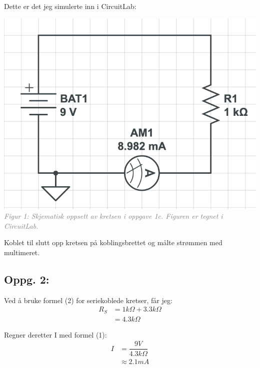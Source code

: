 \documentclass{article}
\begin{document}
             Dette er det jeg simulerte inn i CircuitLab: \linebreak
            \begin{center}
                \includegraphics[scale=0.5]{vedlegg/1c.png}\linebreak
                \textit{\textcolor{gray}{Figur 1: Skjematisk oppsett av kretsen i oppgave 1c. Figuren er tegnet i CircuitLab.}}
            \end{center} 
            
            Koblet til slutt opp kretsen på koblingsbrettet og målte strømmen med multimeret.
        
        \subsection*{Oppg. 2:}
            Ved å bruke formel (2) for seriekoblede kretser, får jeg:
            \begin{equation*}
                \begin{split}
                    R_S &= 1k\Omega + 3.3k\Omega \\
                        &= 4.3k\Omega
                \end{split}
            \end{equation*}
            
            Regner deretter I med formel (1):
                \begin{equation*}
                    \begin{split}
                        I &= \dfrac{9V}{4.3k\Omega} \\
                            &\approx 2.1mA
                    \end{split}
                \end{equation*}
            
\end{document}
